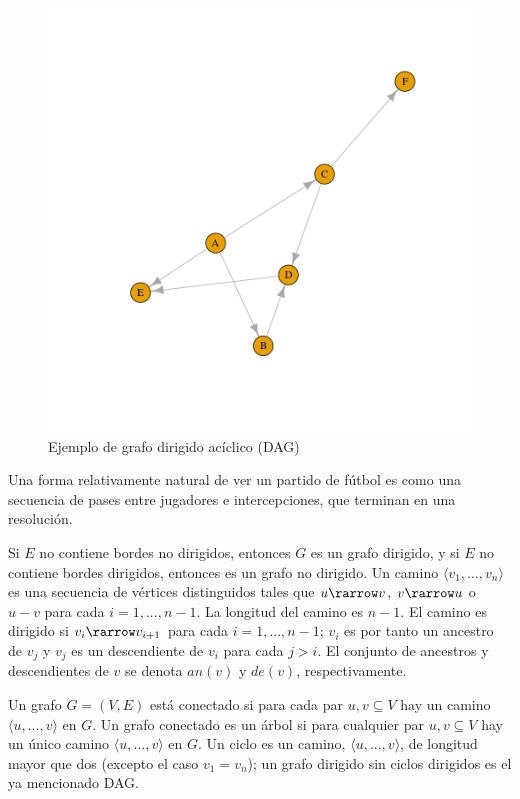 \begin{figure}[h!]
    \centering
     \includegraphics[width=\textwidth]{./img/dag.png}
     \caption{Ejemplo de grafo dirigido acíclico (DAG)}
     \label{img:dag1}
    \end{figure}

Una forma relativamente natural de ver un partido de fútbol es como una secuencia de 
pases entre jugadores e intercepciones, que terminan en una resolución. 

Si $E$ no contiene bordes no dirigidos, entonces $G$ es un grafo dirigido, y si $E$ no 
contiene bordes dirigidos, entonces es un grafo no dirigido. Un camino $ \langle v_{1},...,v_{n} \rangle $ 
es una secuencia de vértices distinguidos tales que $u \rarrow v$, $v \rarrow u$ o $u - v$ para 
cada $i= 1,..., n-1$. 
La longitud del camino es $n-1$. El camino es dirigido si $v_{i} \rarrow v_{i+1}$ para cada $i= 1,..., n-1$; $v_{i}$ es 
por tanto un ancestro de $v_{j}$ y $v_{j}$ es un descendiente de $v_{i}$ para cada $j > i$. El conjunto de ancestros y 
descendientes de $v$ se denota $an(v)$ y $de(v)$, respectivamente.

Un grafo $G= (V, E)$ está conectado si para cada par ${u, v} \subseteq V$ hay un camino $ \langle u,...,v \rangle$ en $G$. Un 
grafo conectado es un árbol si para cualquier par ${u,v} \subseteq V$ hay un único camino $\langle u,...,v \rangle$ en $G$. Un ciclo 
es un camino, $\langle u,...,v \rangle$, de longitud mayor que dos (excepto el caso $v_{1} = v_{n}$); un grafo dirigido sin ciclos dirigidos 
es el ya mencionado DAG. 

